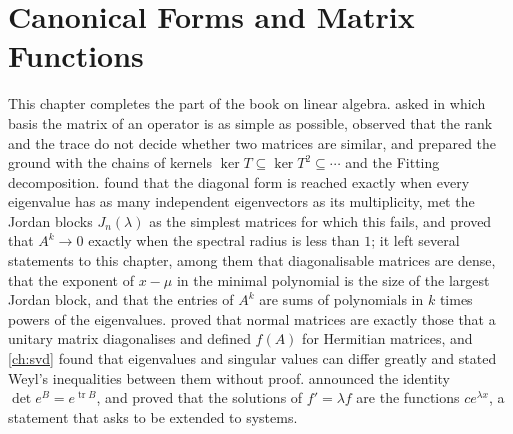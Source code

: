 \chapter{Canonical Forms and Matrix Functions}
\label{ch:canonical-forms}


This chapter completes the part of the book on linear algebra.  asked in which basis the matrix of an operator is as simple as possible, observed that the rank and the trace do not decide whether two matrices are similar, and prepared the ground with the chains of kernels $\ker T\subseteq\ker T^2\subseteq\cdots$ and the Fitting decomposition.  found that the diagonal form is reached exactly when every eigenvalue has as many independent eigenvectors as its multiplicity, met the Jordan blocks $J_n(\lambda)$ as the simplest matrices for which this fails, and proved that $A^k\to0$ exactly when the spectral radius is less than $1$; it left several statements to this chapter, among them that diagonalisable matrices are dense, that the exponent of $x-\mu$ in the minimal polynomial is the size of the largest Jordan block, and that the entries of $A^k$ are sums of polynomials in $k$ times powers of the eigenvalues.  proved that normal matrices are exactly those that a unitary matrix diagonalises and defined $f(A)$ for Hermitian matrices, and \cref{ch:svd} found that eigenvalues and singular values can differ greatly and stated Weyl's inequalities between them without proof.  announced the identity $\det e^B=e^{\operatorname{tr}B}$, and  proved that the solutions of $f'=\lambda f$ are the functions $ce^{\lambda x}$, a statement that asks to be extended to systems.

